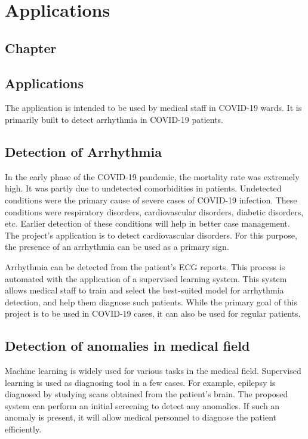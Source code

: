 \thispagestyle{fancy}
\chapter{Applications} \label{ch:applications}
\section*{\centering Chapter \thechapter}
\section*{\centering Applications}

The application is intended to be used by medical staff in COVID-19 wards. It is primarily
built to detect arrhythmia in COVID-19 patients.

\section{Detection of Arrhythmia} \label{sec:detection_of_arrhythmia}
In the early phase of the COVID-19 pandemic, the mortality rate was extremely high. It was
partly due to undetected comorbidities in patients. Undetected conditions were the primary
cause of severe cases of COVID-19 infection. These conditions were respiratory disorders,
cardiovascular disorders, diabetic disorders, etc. Earlier detection of these conditions will
help in better case management. The project's application is to detect cardiovascular
disorders. For this purpose, the presence of an arrhythmia can be used as a primary sign.

Arrhythmia can be detected from the patient's ECG reports. This process is automated with the
application of a supervised learning system. This system allows medical staff to train and
select the best-suited model for arrhythmia detection, and help them diagnose such patients.
While the primary goal of this project is to be used in COVID-19 cases, it can also be used for
regular patients.

\section{Detection of anomalies in medical field} \label{sec:detection_of_anomalies_in_medica_field}
Machine learning is widely used for various tasks in the medical field. Supervised learning is
used as diagnosing tool in a few cases. For example, epilepsy is diagnosed by studying scans
obtained from the patient's brain. The proposed system can perform an initial screening to
detect any anomalies. If such an anomaly is present, it will allow medical personnel to
diagnose the patient efficiently.

